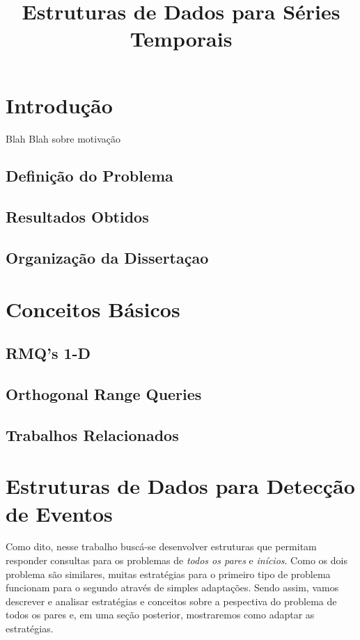\documentclass[12pt]{article}
\begin{document}
\nocite{*}

\title{Estruturas de Dados para Séries Temporais}

\maketitle

\section{Introdução}
Blah Blah sobre motivação
\subsection{Definição do Problema}
\subsection{Resultados Obtidos}
\subsection{Organização da Dissertaçao}
 
\section{Conceitos Básicos}
\subsection{RMQ's 1-D}
\subsection{Orthogonal Range Queries}
\subsection{Trabalhos Relacionados}

\section{Estruturas de Dados para Detecção de Eventos}

Como dito, nesse trabalho buscá-se desenvolver estruturas
que permitam responder consultas para os problemas de \textit{todos os pares} e \textit{inícios}.
Como os dois problema são similares, muitas estratégias
para o primeiro tipo de problema funcionam para o segundo através
de simples adaptações. Sendo assim, vamos descrever e analisar
estratégias e conceitos sobre a pespectiva do problema de 
todos os pares e, em uma seção posterior, mostraremos como adaptar
as estratégias.
\end{document}
